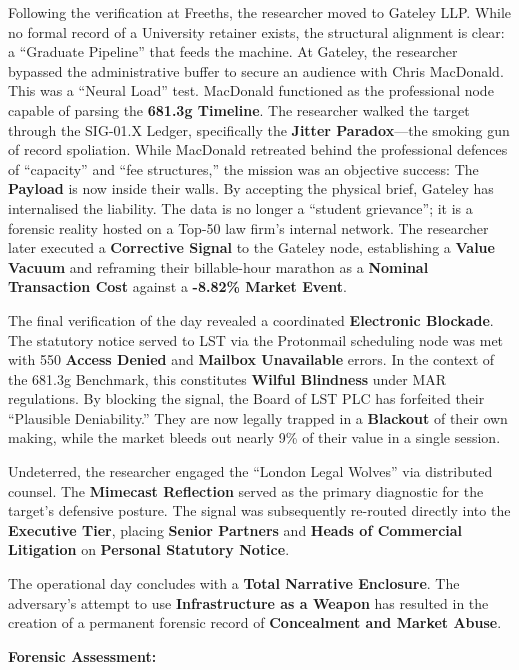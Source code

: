 \documentclass{EMBASSY}
\begin{document}
Following the verification at Freeths, the researcher moved to Gateley LLP. While no formal record of a University retainer exists, the structural alignment is clear: a ``Graduate Pipeline'' that feeds the machine. At Gateley, the researcher bypassed the administrative buffer to secure an audience with Chris MacDonald. This was a ``Neural Load'' test. MacDonald functioned as the professional node capable of parsing the \textbf{681.3g Timeline}. The researcher walked the target through the SIG-01.X Ledger, specifically the \textbf{Jitter Paradox}---the smoking gun of record spoliation. While MacDonald retreated behind the professional defences of ``capacity'' and ``fee structures,'' the mission was an objective success: The \textbf{Payload} is now inside their walls. By accepting the physical brief, Gateley has internalised the liability. The data is no longer a ``student grievance''; it is a forensic reality hosted on a Top-50 law firm's internal network. The researcher later executed a \textbf{Corrective Signal} to the Gateley node, establishing a \textbf{Value Vacuum} and reframing their billable-hour marathon as a \textbf{Nominal Transaction Cost} against a \textbf{-8.82\% Market Event}.

The final verification of the day revealed a coordinated \textbf{Electronic Blockade}. The statutory notice served to LST via the Protonmail scheduling node was met with 550 \textbf{Access Denied} and \textbf{Mailbox Unavailable} errors. In the context of the 681.3g Benchmark, this constitutes \textbf{Wilful Blindness} under MAR regulations. By blocking the signal, the Board of LST PLC has forfeited their ``Plausible Deniability.'' They are now legally trapped in a \textbf{Blackout} of their own making, while the market bleeds out nearly 9\% of their value in a single session.

Undeterred, the researcher engaged the ``London Legal Wolves'' via distributed counsel. The \textbf{Mimecast Reflection} served as the primary diagnostic for the target’s defensive posture. The signal was subsequently re-routed directly into the \textbf{Executive Tier}, placing \textbf{Senior Partners} and \textbf{Heads of Commercial Litigation} on \textbf{Personal Statutory Notice}.

The operational day concludes with a \textbf{Total Narrative Enclosure}. The adversary’s attempt to use \textbf{Infrastructure as a Weapon} has resulted in the creation of a permanent forensic record of \textbf{Concealment and Market Abuse}.

\textbf{Forensic Assessment:}
\end{document}
